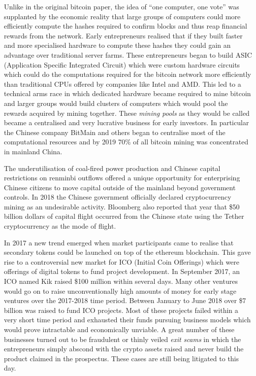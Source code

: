 Unlike in the original bitcoin paper, the idea of ``one computer, one vote'' was
supplanted by the economic reality that large groups of computers could more
efficiently compute the hashes required to confirm blocks and thus reap
financial rewards from the network. Early entrepreneurs realised that if they
built faster and more specialised hardware to compute these hashes they could
gain an advantage over traditional server farms. These entrepreneurs began to
build ASIC (Application Specific Integrated Circuit) which were custom hardware
circuits which could do the computations required for the bitcoin network more
efficiently than traditional CPUs offered by companies like Intel and AMD. This
led to a technical arms race in which dedicated hardware became required to mine
bitcoin and larger groups would build clusters of computers which would pool the
rewards acquired by mining together. These \textit{mining pools} as they would be
called became a centralised and very lucrative business for early investors. In
particular the Chinese company BitMain and others began to centralise most of
the computational resources and by 2019 70\% of all bitcoin mining was
concentrated in
mainland China.


The underutilisation of coal-fired power production and Chinese capital
restrictions on renminbi outflows offered a unique opportunity for enterprising
Chinese citizens to move capital outside of the mainland beyond government
controls. In 2018 the Chinese government officially declared cryptocurrency
mining as an undesirable activity. Bloomberg also reported that year that \$50
billion dollars of capital flight occurred from the Chinese state using the
Tether cryptocurrency as the mode of flight. \cite{leising2020}


In 2017 a new trend emerged when market participants came to realise that
secondary tokens could be launched on top of the ethereum blockchain. This gave
rise to a controversial new market for ICO (Initial Coin Offerings) which were
offerings of digital tokens to fund project development. In September 2017, an
ICO named Kik raised \$100 million within several days. Many other ventures
would go on to raise unconventionally high amounts of money for early stage
ventures over the 2017-2018 time period. Between January to June 2018 over \$7
billion was raised to fund ICO projects. Most of these projects failed within a
very short time period and exhausted their funds pursuing business models which
would prove intractable and economically unviable. A great number of these
businesses turned out to be fraudulent or thinly veiled \textit{exit scams} in
which the entrepreneurs simply abscond with the crypto assets raised and
never build the product claimed in the prospectus. These cases are still being
litigated to this day.

